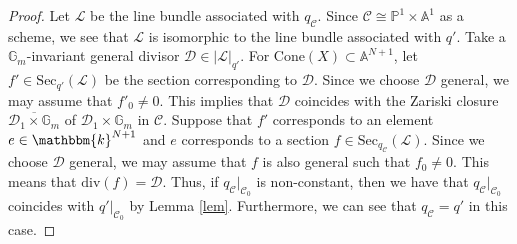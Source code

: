 \documentclass[12pt,twoside]{amsart}
\theoremstyle{definition}
\begin{document}
\begin{proof}
Let $\mathscr{L}$ be the line bundle associated with $q_{\mathcal{C}}$.
Since $\mathcal{C}\cong\mathbb{P}^1\times \mathbb{A}^1$ as a scheme, we see that $\mathscr{L}$ is isomorphic to the line bundle associated with $q'$.
Take a $\mathbb{G}_m$-invariant general divisor $\mathcal{D}\in|\mathscr{L}|_{q'}$.
For $\mathrm{Cone}(X)\subset \mathbb{A}^{N+1}$, let $f'\in\mathrm{Sec}_{q'}(\mathscr{L})$ be the section corresponding to $\mathcal{D}$.
Since we choose $\mathcal{D}$ general, we may assume that $f'_0\ne0$. 
This implies that $\mathcal{D}$ coincides with the Zariski closure $\overline{\mathcal{D}_1\times\mathbb{G}_m}$ of $\mathcal{D}_1\times\mathbb{G}_m$ in $\mathcal{C}$.
Suppose that $f'$ corresponds to an element $e\in\mathbbm{k}^{N+1}$ and $e$ corresponds to a section $f\in\mathrm{Sec}_{q_{\mathcal{C}}}(\mathscr{L})$.
Since we choose $\mathcal{D}$ general, we may assume that $f$ is also general such that $f_0\ne0$.
This means that $\mathrm{div}(f)=\mathcal{D}$.
Thus, if $q_{\mathcal{C}}|_{\mathcal{C}_0}$ is non-constant, then we have that $q_{\mathcal{C}}|_{\mathcal{C}_0}$ coincides with $q'|_{\mathcal{C}_0}$ by Lemma \ref{lem}.
Furthermore, we can see that $q_{\mathcal{C}}=q'$ in this case.


\end{proof}
\end{document}
